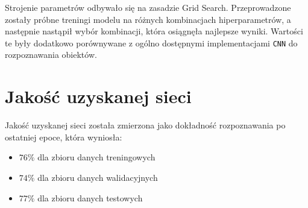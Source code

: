 \documentclass[11pt]{article}
\begin{document}
	Strojenie parametrów odbywało się na zasadzie Grid Search. Przeprowadzone zostały próbne treningi modelu na różnych kombinacjach hiperparametrów, a następnie nastąpił wybór kombinacji,
	która osiągnęła najlepsze wyniki. Wartości te były dodatkowo porównywane z ogólno dostępnymi implementacjami \texttt{CNN} do rozpoznawania obiektów.

	\section {Jakość uzyskanej sieci}
	Jakość uzyskanej sieci została zmierzona jako dokładność rozpoznawania po ostatniej epoce, która wyniosła:
	\begin{itemize}
		\item $76\%$ dla zbioru danych treningowych
		\item $74\%$ dla zbioru danych walidacyjnych
		\item $77\%$ dla zbioru danych testowych
	\end{itemize}
\end{document}
